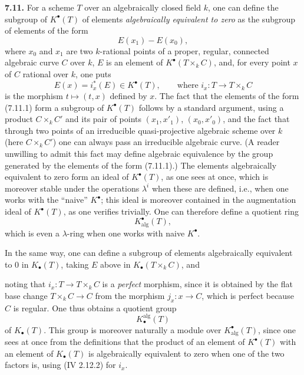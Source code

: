 \textbf{7.11.} For a scheme \(T\) over an algebraically closed field \(k\), one can define the subgroup of \(K^\bullet(T)\) of elements \emph{algebraically equivalent to zero} as the subgroup of elements of the form
\begin{equation}\tag{7.11.1}
  E(x_1)-E(x_0),
\end{equation}
where \(x_0\) and \(x_1\) are two \(k\)-rational points of a proper, regular, connected algebraic curve \(C\) over \(k\), \(E\) is an element of \(K^\bullet(T\times_k C)\), and, for every point \(x\) of \(C\) rational over \(k\), one puts
\[
  E(x)=i_x^*(E)\in K^\bullet(T),\qquad\text{where }
  i_x:T\longrightarrow T\times_k C
\]
is the morphism \(t\mapsto(t,x)\) defined by \(x\). The fact that the elements of the form (7.11.1) form a subgroup of \(K^\bullet(T)\) follows by a standard argument, using a product \(C\times_k C'\) and its pair of points \((x_1,x'_1)\), \((x_0,x'_0)\), and the fact that through two points of an irreducible quasi-projective algebraic scheme over \(k\) (here \(C\times_k C'\)) one can always pass an irreducible algebraic curve. (A reader unwilling to admit this fact may define algebraic equivalence by the group generated by the elements of the form (7.11.1).) The elements algebraically equivalent to zero form an ideal of \(K^\bullet(T)\), as one sees at once, which is moreover stable under the operations \(\lambda^i\) when these are defined, i.e., when one works with the ``naive'' \(K^\bullet\); this ideal is moreover contained in the augmentation ideal of \(K^\bullet(T)\), as one verifies trivially. One can therefore define a quotient ring
\begin{equation}\tag{7.11.2}
  K^\bullet_{\mathrm{alg}}(T),
\end{equation}
which is even a \(\lambda\)-ring when one works with naive \(K^\bullet\).

In the same way, one can define a subgroup of elements algebraically equivalent to 0 in \(K_\bullet(T)\), taking \(E\) above in \(K_\bullet(T\times_k C)\), and

%

noting that \(i_x:T\to T\times_k C\) is a \emph{perfect} morphism, since it is obtained by the flat base change \(T\times_k C\to C\) from the morphism \(j_x:x\to C\), which is perfect because \(C\) is regular. One thus obtains a quotient group
\begin{equation}\tag{7.11.3}
  K_\bullet^{\mathrm{alg}}(T)
\end{equation}
of \(K_\bullet(T)\). This group is moreover naturally a module over \(K^\bullet_{\mathrm{alg}}(T)\), since one sees at once from the definitions that the product of an element of \(K^\bullet(T)\) with an element of \(K_\bullet(T)\) is algebraically equivalent to zero when one of the two factors is, using (IV 2.12.2) for \(i_x\).

